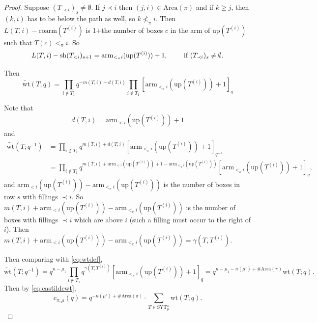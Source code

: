 \documentclass[12pt,reqno]{amsart}
\theoremstyle{plain}
\theoremstyle{definition}
\theoremstyle{remark}
\theoremstyle{example}
\numberwithin{equation}{section}
\newcommand\up{\mathrm{up}}
\newcommand\arm{\mathrm{arm}}
\newcommand{\SYT}{\mathrm{SYT}}
\newcommand{\wt}{\mathrm{wt}}
\newcommand{\Area}{\mathrm{Area}}
\begin{document}
\begin{proof}
Suppose $(T_{\prec i})_{s} \neq \emptyset$. If $j \prec i$ then $(j,i) \in \Area(\pi)$ and if $k \geq j$, then $(k,i)$ has to be below the path as well, so $k \nless_\pi i$.    Then $L(T,i) - \mathrm{coarm}(T^{(i)})$ is 1+the number of boxes $c$ in the arm of $\up(T^{(i)})$ such that $T(c) <_\pi i$. So $$ L(T,i) - \mathrm{sh}(T_{<i})_{s+1} = \arm_{<_\pi i}(\up(T^{(i)}))+1, \qquad\hbox{ if } (T_{\prec i})_{s} \neq \emptyset.$$

Then $$ \widetilde{\wt}(T;q) = \prod_{i \notin T_1} q^{-m(T,i)-d(T,i)} \prod_{i \notin T_1} [\arm_{<_\pi i}(\up(T^{(i)}))+1 ]_q $$ 

Note that
\begin{align*}
	d(T,i) = \arm_{<i}(\up(T^{(i)}))+1
\end{align*}
and \begin{align*}
	\widetilde{\wt}(T;q^{-1}) &= 
	\prod_{i \notin T_1} q^{m(T,i)+d(T,i)} [\arm_{<_\pi i}(\up(T^{(i)}))+1]_{q^{-1}} 
	\\
	&= \prod_{i \notin T_1} q^{m(T,i)+\arm_{<i}(\up(T^{(i)}))+1-\arm_{<_\pi i}(\up(T^{(i)}))}[\arm_{<_\pi i}(\up(T^{(i)}))+1]_{q},
\end{align*}
and $\arm_{<i}(\up(T^{(i)}))-\arm_{<_\pi i}(\up(T^{(i)}))$ is the number of boxes in row $s$ with fillings $\prec i$. So $m(T,i)+\arm_{<i}(\up(T^{(i)}))-\arm_{<_\pi i}(\up(T^{(i)}))$ is the number of boxes with fillings $\prec i$ which are above $i$ (such a filling must occur to the right of $i$). Then $m(T,i)+\arm_{<i}(\up(T^{(i)}))-\arm_{<_\pi i}(\up(T^{(i)})) = \gamma(T,T^{(i)})$.

Then comparing with \eqref{eq:wtdef}, $$ \widetilde{\wt}(T;q^{-1}) = q^{n-\mu_1} \prod_{i\notin T_1} q^{\gamma(T,T^{(i)})} [\arm_{<_\pi i}(\up(T^{(i)}))+1]_{q} = q^{n-\mu_1-n(\mu')+\# \Area(\pi)} \wt(T;q). $$ Then by \eqref{eq:castildewt},  $$  c_{\pi,\mu}(q) = q^{-n(\mu')+\#\Area(\pi)} \cdot \sum_{T \in \SYT_\mu^\pi} \wt(T;q).$$

\end{proof}
\end{document}
